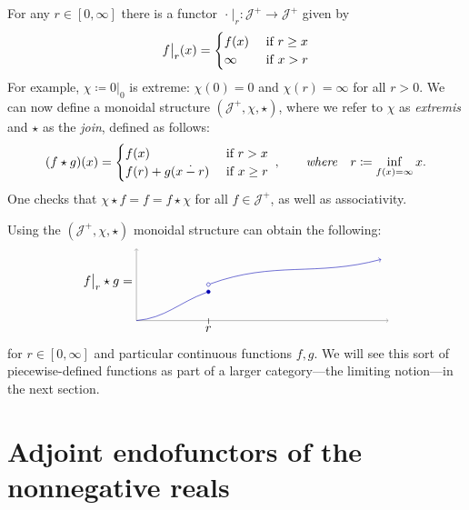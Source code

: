 \documentclass[11pt, one side, article]{memoir}
\theoremstyle{definition}
\theoremstyle{plain}
\newenvironment{example}
  {\pushQED{\qed}\renewcommand{\qedsymbol}{$\lozenge$}\examplex}
  {\popQED\endexamplex}
\newcommand{\cat}[1]{\mathcal{#1}}%
\newcommand{\tn}[1]{\textnormal{#1}}
\newcommand{\blank}[1][1pt]{\hspace{#1}\cdot\hspace{#1}}
\newcommand{\rest}[2][\blank]{#1\big|_{#2}}
\newcommand{\hi}[4][]{#1 #2 \tn{\textit{#4}} #3}
\newcommand{\where}[1][,]{\hi[#1]{\qquad}{\quad}{where}}
\newcommand{\dotminus}{\mathbin{\dot{-}}}
\begin{document}
For any $r\in[0,\infty]$ there is a functor $\rest{r}\colon\cat{J}^+\to\cat{J}^+$ given by
\[
\rest[f]{r}(x)=
	\begin{cases}
		f(x)&\tn{ if }r\geq x\\
		\infty&\tn{ if } x>r
	\end{cases}
\]
For example, $\chi\coloneqq\rest[0]{0}$ is extreme: $\chi(0)=0$ and $\chi(r)=\infty$ for all $r>0$. 
We can now define a monoidal structure $(\cat{J}^+,\chi,\star)$, where we refer to $\chi$ as \emph{extremis} and $\star$ as the \emph{join}, defined as follows:
\[
(f\star g)(x)=
\begin{cases}
	f(x)&\tn{ if }r> x\\
	f(r)+g(x\dotminus r)&\tn{ if }x\geq r
\end{cases}
\;\where
r\coloneqq\inf_{f(x)=\infty}x.
\]
One checks that $\chi\star f=f=f\star\chi$ for all $f\in\cat{J}^+$, as well as associativity.

\begin{example}
Using the $(\cat{J}^+,\chi,\star)$ monoidal structure can obtain the following:
\begin{equation}\label{eqn.lowersemicont}
\rest[f]{r}\star g=
\begin{tikzpicture}[baseline=(cop)]
	\draw[->, very thin] (0, 0) -- (7, 0);
	\draw[->, very thin] (0, 0) -- (0, 2);
	\node (sm) at (2,0) {$\shortmid$};
	\node[below=1pt] at (sm) {$r$};
	\begin{scope}[blue!70!black]
  	\node[circle, draw, inner sep=1pt, fill] at (2,.8) (ccl) {};
  	\draw (0, 0) to[out=5, in=200] (ccl);
  	\node[circle, draw, inner sep=1pt] at (2,1) (cop) {};
  	\draw[->] (cop) to[out=20, in=195] (6.8, 1.7);
	\end{scope}
\end{tikzpicture}
\end{equation}
for $r\in[0,\infty]$ and particular continuous functions $f,g$. We will see this sort of piecewise-defined functions as part of a larger category---the limiting notion---in the next section.

\end{example}

\section{Adjoint endofunctors of the nonnegative reals}
\end{document}
